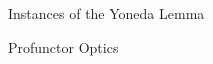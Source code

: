 \documentclass[aspectratio=169]{beamer} %
\begin{document}
{\begin{frame}{Instances of the Yoneda Lemma}
\end{frame}
\begin{frame}{Profunctor Optics}
\end{frame}

}
\end{document}
